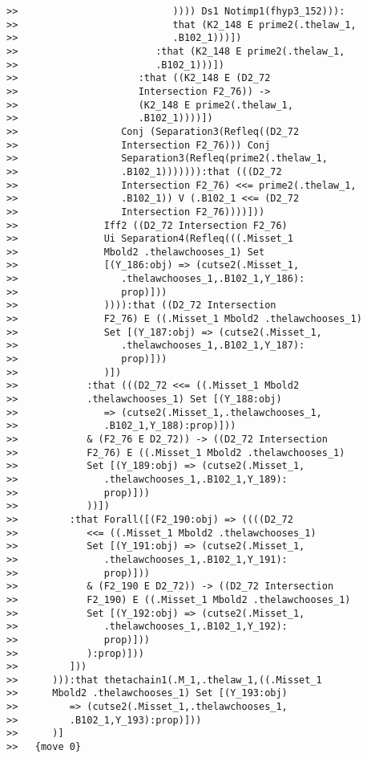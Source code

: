 \documentclass[12pt]{article}
\begin{document}
\begin{verbatim}
>>                           )))) Ds1 Notimp1(fhyp3_152))):
>>                           that (K2_148 E prime2(.thelaw_1,
>>                           .B102_1)))])
>>                        :that (K2_148 E prime2(.thelaw_1,
>>                        .B102_1)))])
>>                     :that ((K2_148 E (D2_72
>>                     Intersection F2_76)) ->
>>                     (K2_148 E prime2(.thelaw_1,
>>                     .B102_1))))])
>>                  Conj (Separation3(Refleq((D2_72
>>                  Intersection F2_76))) Conj
>>                  Separation3(Refleq(prime2(.thelaw_1,
>>                  .B102_1))))))):that (((D2_72
>>                  Intersection F2_76) <<= prime2(.thelaw_1,
>>                  .B102_1)) V (.B102_1 <<= (D2_72
>>                  Intersection F2_76))))]))
>>               Iff2 ((D2_72 Intersection F2_76)
>>               Ui Separation4(Refleq(((.Misset_1
>>               Mbold2 .thelawchooses_1) Set
>>               [(Y_186:obj) => (cutse2(.Misset_1,
>>                  .thelawchooses_1,.B102_1,Y_186):
>>                  prop)]))
>>               )))):that ((D2_72 Intersection
>>               F2_76) E ((.Misset_1 Mbold2 .thelawchooses_1)
>>               Set [(Y_187:obj) => (cutse2(.Misset_1,
>>                  .thelawchooses_1,.B102_1,Y_187):
>>                  prop)]))
>>               )])
>>            :that (((D2_72 <<= ((.Misset_1 Mbold2
>>            .thelawchooses_1) Set [(Y_188:obj)
>>               => (cutse2(.Misset_1,.thelawchooses_1,
>>               .B102_1,Y_188):prop)]))
>>            & (F2_76 E D2_72)) -> ((D2_72 Intersection
>>            F2_76) E ((.Misset_1 Mbold2 .thelawchooses_1)
>>            Set [(Y_189:obj) => (cutse2(.Misset_1,
>>               .thelawchooses_1,.B102_1,Y_189):
>>               prop)]))
>>            ))])
>>         :that Forall([(F2_190:obj) => ((((D2_72
>>            <<= ((.Misset_1 Mbold2 .thelawchooses_1)
>>            Set [(Y_191:obj) => (cutse2(.Misset_1,
>>               .thelawchooses_1,.B102_1,Y_191):
>>               prop)]))
>>            & (F2_190 E D2_72)) -> ((D2_72 Intersection
>>            F2_190) E ((.Misset_1 Mbold2 .thelawchooses_1)
>>            Set [(Y_192:obj) => (cutse2(.Misset_1,
>>               .thelawchooses_1,.B102_1,Y_192):
>>               prop)]))
>>            ):prop)]))
>>         ]))
>>      ))):that thetachain1(.M_1,.thelaw_1,((.Misset_1
>>      Mbold2 .thelawchooses_1) Set [(Y_193:obj)
>>         => (cutse2(.Misset_1,.thelawchooses_1,
>>         .B102_1,Y_193):prop)]))
>>      )]
>>   {move 0}




\end{verbatim}
\end{document}
